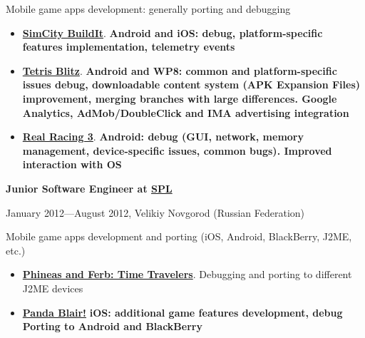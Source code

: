 \subitem Mobile game apps development: generally porting and debugging
\begin{itemize}
\setlength{\itemindent}{20pt}
\item
    \href{http://www.ea.com/simcity-buildit}
        {\bfseries SimCity BuildIt\mdseries}.
        \bfseries Android \mdseries and \bfseries iOS\mdseries:
        debug,
        platform-specific features implementation,
        telemetry events
\item
    \href{http://www.tetrisblitz.com}
        {\bfseries Tetris Blitz\mdseries}.
        \bfseries Android \mdseries and \bfseries WP8\mdseries:
        common and platform-specific issues debug,
        downloadable content system (APK Expansion Files) improvement,
        merging branches with large differences.
        Google Analytics, AdMob/DoubleClick and IMA advertising integration
\item
    \href{http://www.ea.com/real-racing-3}
    {\bfseries Real Racing 3\mdseries}.
        \bfseries Android\mdseries:
        debug (GUI, network, memory management, device-specific issues, common bugs).
        Improved interaction with OS
\end{itemize}

\vspace{5pt}

{
\fontsize{12pt}{12pt}\selectfont
\bfseries Junior Software Engineer at
\href{http://spl.co}{\bfseries SPL\mdseries}
\mdseries
}

{
\fontsize{9pt}{8pt}\selectfont
January 2012---August 2012, Velikiy Novgorod (Russian Federation)
}

Mobile game apps development and porting
(iOS, Android, BlackBerry, J2ME, etc.)

\begin{itemize}

\setlength{\itemindent}{20pt}
\item
    \href{http://java.mob.org/game/phineas\_and\_ferb\_time\_travelers.html}
        {\bfseries Phineas and Ferb: Time Travelers\mdseries}.
        Debugging and porting to different J2ME devices
\item
    \href{https://itunes.apple.com/us/app/panda-blair!/id500995558?mt=8}
        {\bfseries Panda Blair!\mdseries}
        \bfseries iOS\mdseries: additional game features development, debug
        Porting to \bfseries Android \mdseries and \bfseries BlackBerry\mdseries
\end{itemize}

\vspace{5pt}

